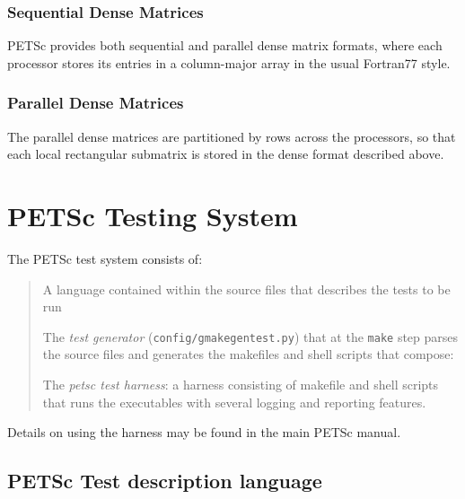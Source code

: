 \subsection{Sequential Dense Matrices}

PETSc provides both sequential and parallel dense matrix formats,
where each processor stores its entries in a column-major array in the
usual Fortran77 style.

\subsection{Parallel Dense Matrices}

The parallel dense matrices are partitioned by rows across the
processors, so that each local rectangular submatrix is stored in the
dense format described above.


\chapter{PETSc Testing System}
  \label{petsc-testing-system}


The PETSc test system consists of:
%
\begin{quote}
\begin{list}{.}
{
\setlength{\rightmargin}{\leftmargin}
}

\item A language contained within the source files that describes the
tests to be run

\item The \emph{test generator} (\lstinline{config/gmakegentest.py}) that at the
\lstinline{make} step parses the source files and generates the makefiles
and shell scripts that compose:

\item The \emph{petsc test harness}: a harness consisting of makefile and
shell scripts that runs the executables with several
logging and reporting features.
\end{list}

\end{quote}

Details on using the harness may be found in the main PETSc manual.

\section{PETSc Test description language%
  \label{petsc-test-description-language}%
}

